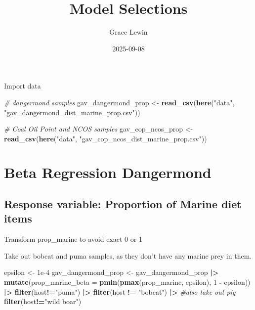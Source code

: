 \documentclass[
]{article}
\title{Model Selections}
\author{Grace Lewin}
\date{2025-09-08}
\newenvironment{Shaded}{\begin{snugshade}}{\end{snugshade}}
\newcommand{\AttributeTok}[1]{\textcolor[rgb]{0.13,0.29,0.53}{#1}}
\newcommand{\CommentTok}[1]{\textcolor[rgb]{0.56,0.35,0.01}{\textit{#1}}}
\newcommand{\DecValTok}[1]{\textcolor[rgb]{0.00,0.00,0.81}{#1}}
\newcommand{\FloatTok}[1]{\textcolor[rgb]{0.00,0.00,0.81}{#1}}
\newcommand{\FunctionTok}[1]{\textcolor[rgb]{0.13,0.29,0.53}{\textbf{#1}}}
\newcommand{\NormalTok}[1]{#1}
\newcommand{\OtherTok}[1]{\textcolor[rgb]{0.56,0.35,0.01}{#1}}
\newcommand{\SpecialCharTok}[1]{\textcolor[rgb]{0.81,0.36,0.00}{\textbf{#1}}}
\newcommand{\StringTok}[1]{\textcolor[rgb]{0.31,0.60,0.02}{#1}}
\begin{document}
\maketitle

Import data

\begin{Shaded}
\begin{Highlighting}[]
\CommentTok{\# dangermond samples}
\NormalTok{gav\_dangermond\_prop }\OtherTok{\textless{}{-}} \FunctionTok{read\_csv}\NormalTok{(}\FunctionTok{here}\NormalTok{(}\StringTok{"data"}\NormalTok{, }\StringTok{"gav\_dangermond\_dist\_marine\_prop.csv"}\NormalTok{))}

\CommentTok{\# Coal Oil Point and NCOS samples}
\NormalTok{gav\_cop\_ncos\_prop }\OtherTok{\textless{}{-}} \FunctionTok{read\_csv}\NormalTok{(}\FunctionTok{here}\NormalTok{(}\StringTok{"data"}\NormalTok{, }\StringTok{"gav\_cop\_ncos\_dist\_marine\_prop.csv"}\NormalTok{))}
\end{Highlighting}
\end{Shaded}

\section{Beta Regression Dangermond}\label{beta-regression-dangermond}

\subsection{Response variable: Proportion of Marine diet
items}\label{response-variable-proportion-of-marine-diet-items}

Transform prop\_marine to avoid exact 0 or 1

Take out bobcat and puma samples, as they don't have any marine prey in
them.

\begin{Shaded}
\begin{Highlighting}[]
\NormalTok{epsilon }\OtherTok{\textless{}{-}} \FloatTok{1e{-}4}
\NormalTok{gav\_dangermond\_prop }\OtherTok{\textless{}{-}}\NormalTok{ gav\_dangermond\_prop }\SpecialCharTok{|\textgreater{}} 
  \FunctionTok{mutate}\NormalTok{(}\AttributeTok{prop\_marine\_beta =} \FunctionTok{pmin}\NormalTok{(}\FunctionTok{pmax}\NormalTok{(prop\_marine, epsilon), }\DecValTok{1} \SpecialCharTok{{-}}\NormalTok{ epsilon)) }\SpecialCharTok{|\textgreater{}} 
  \FunctionTok{filter}\NormalTok{(host}\SpecialCharTok{!=}\StringTok{"puma"}\NormalTok{) }\SpecialCharTok{|\textgreater{}} 
  \FunctionTok{filter}\NormalTok{(host }\SpecialCharTok{!=} \StringTok{"bobcat"}\NormalTok{) }\SpecialCharTok{|\textgreater{}} 
  \CommentTok{\#also take out pig}
  \FunctionTok{filter}\NormalTok{(host}\SpecialCharTok{!=}\StringTok{"wild boar"}\NormalTok{)}
\end{Highlighting}
\end{Shaded}
\end{document}
